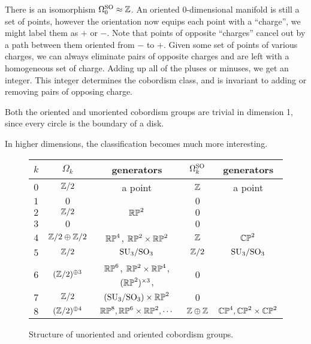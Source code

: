\begin{example}
	There is an isomorphism $\Omega_0^{\mathrm{SO}} \approx \mathbb{Z}$. An oriented 0-dimensional manifold is still a set of points, however the orientation now equips each point with a ``charge'', we might label them as $+$ or $-$. Note that points of opposite ``charges'' cancel out by a path between them oriented from $-$ to $+$. Given some set of points of various charges, we can always eliminate pairs of opposite charges and are left with a homogeneous set of charge. Adding up all of the pluses or minuses, we get an integer. This integer determines the cobordism class, and is invariant to adding or removing pairs of opposing charge.
\end{example}

\begin{example}
	Both the oriented and unoriented cobordism groups are trivial in dimension 1, since every circle is the boundary of a disk.
\end{example}

In higher dimensions, the classification becomes much more interesting. 

\begin{figure}[ht]
	\renewcommand{\arraystretch}{1.2}
	\centering
	\begin{tabular}{r||c|c||c|c}
		$k$ & $\Omega_k$          & generators                                          & $\Omega_k^{\mathrm{SO}}$ & generators                 \\
		\hline
		$0$ & $\mathbb{Z}/2$              & a point                                             & $\mathbb{Z}$           & a point                    \\
		$1$ & $0$                 &                                                     & $0$            &                            \\
		$2$ & $\mathbb{Z}/2$              & $\mathbb{RP}^2$                                             & $0$            &                            \\
		$3$ & $0$                 &                                                     & $0$            &                            \\
		$4$ & $\mathbb{Z}/2\oplus \mathbb{Z}/2$   & $\mathbb{RP}^4$, $\mathbb{RP}^2\times \mathbb{RP}^2$                        & $\mathbb{Z}$           & $\mathbb{CP}^2$                    \\
		$5$ & $\mathbb{Z}/2$              & $\mathrm{SU}_3/\mathrm{SO}_3$                                       & $\mathbb{Z}/2$         & $\mathrm{SU}_3/\mathrm{SO}_3$              \\
		$6$ & $(\mathbb{Z}/2)^{\oplus 3}$ & $\mathbb{RP}^6$, $\mathbb{RP}^2\times \mathbb{RP}^4$, $(\mathbb{RP}^2)^{\times 3}$, & $0$            &                            \\
		$7$ & $\mathbb{Z}/2$              & $(\mathrm{SU}_3/\mathrm{SO}_3) \times \mathbb{RP}^2$                        & $0$            &                            \\
		$8$ & $(\mathbb{Z}/2)^{\oplus 4}$ & $\mathbb{RP}^8, \mathbb{RP}^6\times \mathbb{RP}^2, \cdots$                  & $\mathbb{Z}\oplus \mathbb{Z}$  & $\mathbb{CP}^4, \mathbb{CP}^2\times \mathbb{CP}^2$ \\
	\end{tabular}
	\medskip
	\caption{Structure of unoriented and oriented cobordism groups.}\label{fig:cobordism-structure-table}
\end{figure}

